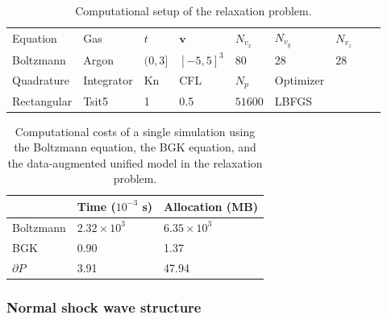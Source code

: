 \documentclass[preprint,3p,12pt,sort&compress]{elsarticle}
\begin{document}
\begin{table}[htbp]
    \caption{Computational setup of the relaxation problem.} 
    \centering
    \begin{tabular}{lllllllll} 
        \hline
        Equation & Gas & $t$ & $\mathbf v$ & $N_{v_x}$ & $N_{v_y}$ & $N_{v_z}$ \\ 
        Boltzmann & Argon & $(0,3]$ & $[-5,5]^3$ & 80 & 28 & 28 \\ 
        \hline
        Quadrature & Integrator & Kn & CFL & $N_p$ & Optimizer \\
        Rectangular & Tsit5 & 1 & 0.5 & $51600$ & LBFGS \\
        \hline
    \end{tabular} 
    \label{tab:relaxation}
\end{table}

\begin{table}[h]
    \centering
    \caption{Computational costs of a single simulation using the Boltzmann equation, the BGK equation, and the data-augmented unified model in the relaxation problem.}
    \begin{tabular}{lll}
        \toprule
        & Time ($10^{-3}$ s) & Allocation (MB) \\
        \midrule
        Boltzmann & $2.32\times 10^3$ & $6.35\times 10^3$ \\
        BGK & 0.90 & 1.37 \\
        $\partial P$ & 3.91 & 47.94 \\
        \bottomrule
    \end{tabular}
    \label{tab:relaxation cost}
\end{table}

\subsubsection{Normal shock wave structure}
\end{document}
